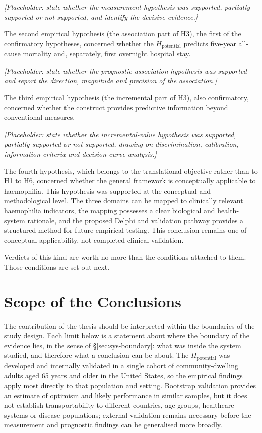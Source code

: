 \medskip
\noindent\emph{[Placeholder: state whether the measurement hypothesis was supported, partially supported or not supported, and identify the decisive evidence.]}

The second empirical hypothesis (the association part of H3), the first of the confirmatory hypotheses, concerned whether the $H_{\text{potential}}$ predicts five-year all-cause mortality and, separately, first overnight hospital stay.

\medskip
\noindent\emph{[Placeholder: state whether the prognostic association hypothesis was supported and report the direction, magnitude and precision of the association.]}

The third empirical hypothesis (the incremental part of H3), also confirmatory, concerned whether the construct provides predictive information beyond conventional measures.

\medskip
\noindent\emph{[Placeholder: state whether the incremental-value hypothesis was supported, partially supported or not supported, drawing on discrimination, calibration, information criteria and decision-curve analysis.]}

The fourth hypothesis, which belongs to the translational objective rather than to H1 to H6, concerned whether the general framework is conceptually applicable to haemophilia. This hypothesis was supported at the conceptual and methodological level. The three domains can be mapped to clinically relevant haemophilia indicators, the mapping possesses a clear biological and health-system rationale, and the proposed Delphi and validation pathway provides a structured method for future empirical testing. This conclusion remains one of conceptual applicability, not completed clinical validation.

Verdicts of this kind are worth no more than the conditions attached to them.
Those conditions are set out next.

\section{Scope of the Conclusions}
\label{sec:scope}

\noindent The contribution of the thesis should be interpreted within the boundaries of the study design. Each limit below is a statement about where the boundary of the evidence lies, in the sense of \S\ref{sec:sys-boundary}: what was inside the system studied, and therefore what a conclusion can be about. The $H_{\text{potential}}$ was developed and internally validated in a single cohort of community-dwelling adults aged 65 years and older in the United States, so the empirical findings apply most directly to that population and setting. Bootstrap \citep{efron_tibshirani_1993,steyerberg_2019} validation provides an estimate of optimism and likely performance in similar samples, but it does not establish transportability to different countries, age groups, healthcare systems or disease populations; external validation remains necessary before the measurement and prognostic findings can be generalised more broadly.

